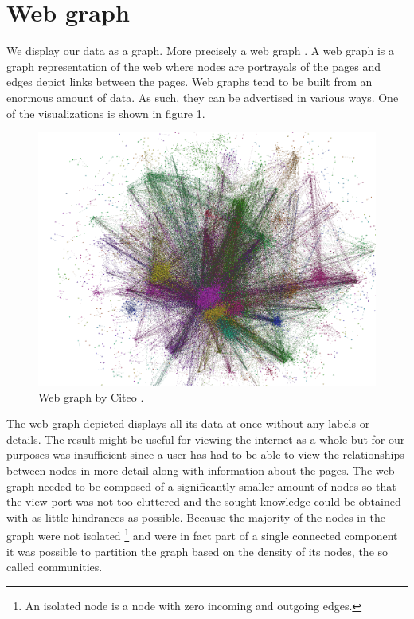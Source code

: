 \section{Web graph} \label{webGraph}
We display our data as a graph. More precisely a web graph \cite{the_web_graph_overview}. A web graph is a graph representation of the web where nodes are portrayals of the pages and edges depict links between the pages. Web graphs tend to be built from an enormous amount of data. As such, they can  be advertised in various ways. One of the visualizations is shown in figure  \ref{hugeWebGraphFireworks}. 
\begin{figure}[ht!]
  \centering
  \includegraphics[width=\textwidth]{Images/hugeWebGraphFireworks.png}
  \caption{Web graph by Citeo \cite{hugeWebGraphFireworks}.}
  \label{hugeWebGraphFireworks}
\end{figure} 
The web graph depicted displays all its data at once without any labels or details. The result might be useful for viewing the internet as a whole but for our purposes was insufficient since a user has had to be able to view the relationships between nodes in more detail along with information about the pages. The web graph needed to be composed of a significantly smaller amount of nodes so that the view port was not too cluttered and the sought knowledge could be obtained with as little hindrances as possible. Because the majority of the nodes in the graph were not isolated \footnote{An isolated node is a node with zero incoming and outgoing edges.} and were in fact part of a single connected component it was possible to partition the graph based on the density of its nodes, the so called communities.

